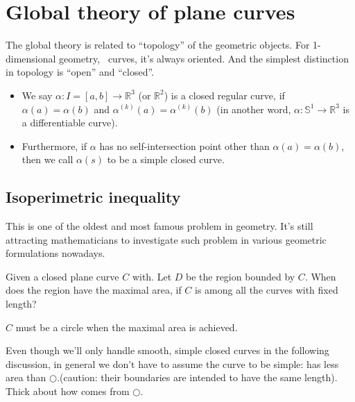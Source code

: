 \setlength{\headheight}{33.24858pt}
\section{Global theory of plane curves}

The global theory is related to ``topology'' of the geometric objects.
For 1-dimensional geometry, \ie\ curves, it's always oriented. And the simplest distinction in topology
is ``open'' and ``closed''.

\begin{definition}
    \begin{itemize}\hfill
        \item We say
              \(\alpha\colon I=[a,b]\to \mathbb{R}
              ^3\)
              (or \(\mathbb{R}^2\))
              is a closed regular curve, if
              \(\alpha(a)=\alpha(b)\)
              and
              \(\alpha^{(k)}
              (a)=\alpha^{(k)}(b)\)
              (in another word,
              \(\alpha\colon \mathbb{S}^1\to \mathbb{R}^3\)
              is a differentiable curve).
        \item Furthermore, if
              \(\alpha\)
              has no
              self-intersection point other than
              $\alpha(a)=\alpha(b)$,
              then we call $\alpha(s)$ to be a simple closed curve.
    \end{itemize}
\end{definition}
\begin{center}
\end{center}

\subsection{Isoperimetric inequality}
This is one of the oldest and most famous problem in geometry. It's still attracting mathematicians to investigate such problem in various geometric formulations nowadays.
\begin{question}
    Given a closed plane curve \(C\) with. Let \(D\) be the
    region bounded by \(C\). When does the region have the
    maximal area, if \(C\) is among all the curves with
    fixed length?
\end{question}
\begin{answer}
    \(C\) must be a circle when the maximal area is
    achieved.
\end{answer}
\begin{remark}
    Even though we'll only handle smooth, simple closed
    curves in the following discussion, in general we
    don't have to assume the curve to be simple:
    {\ooalign{$\bigcirc $\cr $\ \ \,\bigcirc $}}
    has less area than $\bigcirc $.(caution: their boundaries are intended to have the same length). Thick about how
        {\ooalign{$\bigcirc $\cr $\ \ \,\bigcirc $}}
    comes from $\bigcirc $.
\end{remark}

